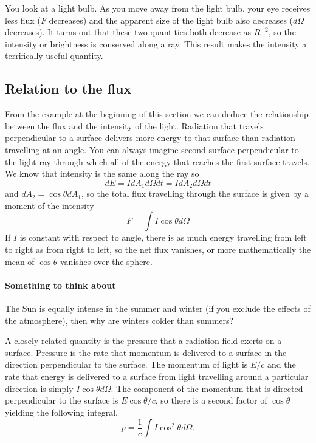 You look at a light bulb.   As you move away from the light bulb, your
eye receives less flux ($F$ decreases) and the apparent size of the
light bulb also decreases ($d\Omega$ decreases).  It turns out that
these two quantities both decrease as $R^{-2}$, so the intensity or
brightness is conserved along a ray.  This result makes the intensity
a terrifically useful quantity.

\subsection{Relation to the flux}
\label{sec:relation-flux}

From the example at the beginning of this section we can deduce the 
relationship between the flux and the intensity of the light.
Radiation that travels perpendicular to a surface delivers more energy to 
that surface than radiation travelling at an angle.   You can always
imagine second surface perpendicular to the light ray through which all of
the energy that reaches the first surface travels.  We know that
intensity is the same along the ray so
\begin{equation}
d E = I d\!A_1 d \Omega d t= I d\!A_2 d \Omega d t
\label{eq:5}
\end{equation}
and $d\!A_2 = \cos \theta d\!A_1$, so the total flux travelling through
the surface is given by a moment of the intensity
\begin{equation}
F = \int I \cos \theta d \Omega
\label{eq:6}
\end{equation}
If $I$ is constant with respect to angle, there is as much energy
travelling from left to right as from right to left, so the net flux
vanishes, or more mathematically the mean of $\cos \theta$ vanishes 
over the sphere.

\paragraph{Something to think about}   The Sun is equally intense in
the summer and winter (if you exclude the effects of the
atmosphere), then why are winters colder than summers?   

A closely related quantity is the pressure that a radiation field
exerts on a surface.  Pressure is the rate that momentum is delivered 
to a surface in the direction perpendicular to the surface.  The
momentum of light is $E/c$ and the rate that energy is 
delivered to a surface from light travelling around a particular
direction is simply $I \cos \theta d\Omega$.  The component 
of the momentum that is directed perpendicular to the surface 
is $E \cos\theta/c$, so there is a second factor of $\cos \theta$ 
yielding the following integral.
\begin{equation}
p = \frac{1}{c} \int I \cos^2 \theta d \Omega.
\label{eq:7}
\end{equation}


